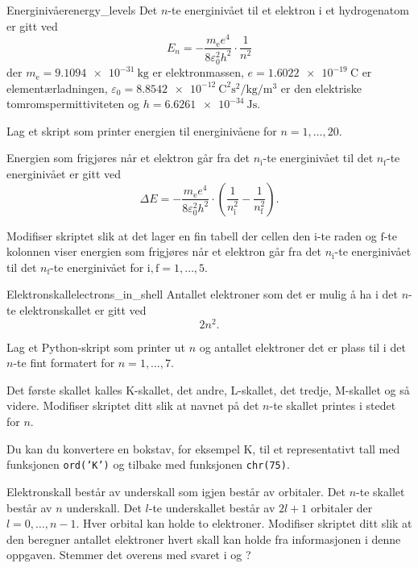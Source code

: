 \exercisechapter

\begin{exercise}{Energinivåer}{energy_levels}
	Det $n$-te energinivået til et elektron i et hydrogenatom er gitt ved
	\begin{equation*}
		E_n = -\frac{m_\mathrm{e}e^4}{8\varepsilon_0^2h^2}\cdot\frac{1}{n^2}
	\end{equation*}
	der $m_\mathrm{e}=\SI{9,1094e-31}{\kilogram}$ er elektronmassen, $e=\SI{1,6022e-19}{\coulomb}$ er elementærladningen, $\varepsilon_0=\SI{8,8542e-12}{\coulomb\squared\second\squared\per\kilogram\per\meter\cubed}$ er den elektriske tomromspermittiviteten og $h=\SI{6,6261e-34}{\joule\second}$.
	
	\subexercise Lag et skript som printer energien til energinivåene for $n=1,\ldots,20$.
	
	Energien som frigjøres når et elektron går fra det $n_\mathrm{i}$-te energinivået til det $n_\mathrm{f}$-te energinivået er gitt ved
	\begin{equation*}
	\Delta E = -\frac{m_\mathrm{e}e^4}{8\varepsilon_0^2h^2}\cdot\left( \frac{1}{n_\mathrm{i}^2}-\frac{1}{n_\mathrm{f}^2}\right) .
	\end{equation*}
	
	\subexercise Modifiser skriptet slik at det lager en fin tabell der cellen den $\mathrm{i}$-te raden og $\mathrm{f}$-te kolonnen viser energien som frigjøres når et elektron går fra det $n_\mathrm{i}$-te energinivået til det $n_\mathrm{f}$-te energinivået for $\mathrm{i},\mathrm{f}=1,\ldots,5$.
\end{exercise}

\begin{exercise}{Elektronskall}{electrons_in_shell}
	Antallet elektroner som det er mulig å ha i det $n$-te elektronskallet er gitt ved
	\begin{equation*}
		2n^2.
	\end{equation*}
	
	\subexercise Lag et Python-skript som printer ut $n$ og antallet elektroner det er plass til i det $n$-te fint formatert for $n=1,\ldots,7$.
	
	\subexercise Det første skallet kalles K-skallet, det andre, L-skallet, det tredje, M-skallet og så videre. Modifiser skriptet ditt slik at navnet på det $n$-te skallet printes i stedet for $n$.
	
	\hint Du kan du konvertere en bokstav, for eksempel K, til et representativt tall med funksjonen \texttt{ord('K')} og tilbake med funksjonen \texttt{chr(75)}.
	
	\subexercise Elektronskall består av underskall som igjen består av orbitaler. Det $n$-te skallet består av $n$ underskall. Det $l$-te underskallet består av $2l+1$ orbitaler der $l=0,\ldots,n-1$. Hver orbital kan holde to elektroner. Modifiser skriptet ditt slik at den beregner antallet elektroner hvert skall kan holde fra informasjonen i denne oppgaven. Stemmer det overens med svaret i  og ?
\end{exercise}

